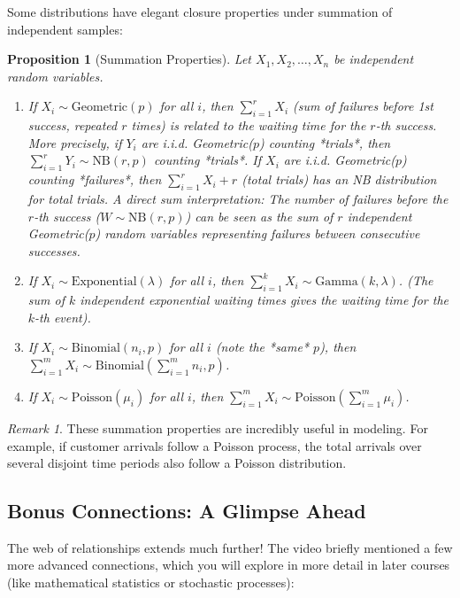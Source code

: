 \documentclass[11pt, letterpaper]{article}
\newtheorem{proposition}[theorem]{Proposition}
\theoremstyle{definition}
\theoremstyle{remark}
\newtheorem{remark}[theorem]{Remark}
\begin{document}
Some distributions have elegant closure properties under summation of independent samples:

\begin{proposition}[Summation Properties] Let $X_1, X_2, \dots, X_n$ be independent random variables.
\begin{enumerate}
    \item If $X_i \sim \text{Geometric}(p)$ for all $i$, then $\sum_{i=1}^r X_i$ (sum of failures before 1st success, repeated $r$ times) is related to the waiting time for the $r$-th success. More precisely, if $Y_i$ are i.i.d. Geometric($p$) counting *trials*, then $\sum_{i=1}^r Y_i \sim \text{NB}(r,p)$ counting *trials*. If $X_i$ are i.i.d. Geometric($p$) counting *failures*, then $\sum_{i=1}^r X_i + r$ (total trials) has an NB distribution for total trials. A direct sum interpretation: The number of failures before the $r$-th success ($W \sim \text{NB}(r,p)$) can be seen as the sum of $r$ independent Geometric($p$) random variables representing failures between consecutive successes.
    \item If $X_i \sim \text{Exponential}(\lambda)$ for all $i$, then $\sum_{i=1}^k X_i \sim \text{Gamma}(k, \lambda)$. (The sum of $k$ independent exponential waiting times gives the waiting time for the $k$-th event).
    \item If $X_i \sim \text{Binomial}(n_i, p)$ for all $i$ (note the *same* $p$), then $\sum_{i=1}^m X_i \sim \text{Binomial}(\sum_{i=1}^m n_i, p)$.
    \item If $X_i \sim \text{Poisson}(\mu_i)$ for all $i$, then $\sum_{i=1}^m X_i \sim \text{Poisson}(\sum_{i=1}^m \mu_i)$.
\end{enumerate}
\end{proposition}

\begin{remark}
These summation properties are incredibly useful in modeling. For example, if customer arrivals follow a Poisson process, the total arrivals over several disjoint time periods also follow a Poisson distribution.
\end{remark}

\subsection{Bonus Connections: A Glimpse Ahead}

The web of relationships extends much further! The video briefly mentioned a few more advanced connections, which you will explore in more detail in later courses (like mathematical statistics or stochastic processes):
\end{document}
